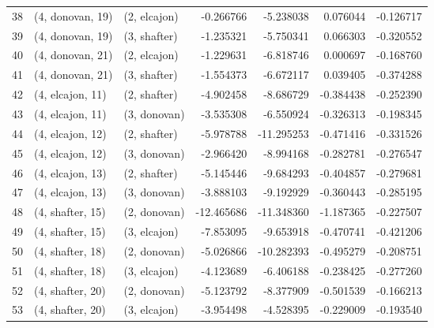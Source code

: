 \begin{tabular}{lllrrrr}
38 &  (4, donovan, 19) &     (2, elcajon) &  -0.266766 &  -5.238038 &   0.076044 & -0.126717 \\
39 &  (4, donovan, 19) &     (3, shafter) &  -1.235321 &  -5.750341 &   0.066303 & -0.320552 \\
40 &  (4, donovan, 21) &     (2, elcajon) &  -1.229631 &  -6.818746 &   0.000697 & -0.168760 \\
41 &  (4, donovan, 21) &     (3, shafter) &  -1.554373 &  -6.672117 &   0.039405 & -0.374288 \\
42 &  (4, elcajon, 11) &     (2, shafter) &  -4.902458 &  -8.686729 &  -0.384438 & -0.252390 \\
43 &  (4, elcajon, 11) &     (3, donovan) &  -3.535308 &  -6.550924 &  -0.326313 & -0.198345 \\
44 &  (4, elcajon, 12) &     (2, shafter) &  -5.978788 & -11.295253 &  -0.471416 & -0.331526 \\
45 &  (4, elcajon, 12) &     (3, donovan) &  -2.966420 &  -8.994168 &  -0.282781 & -0.276547 \\
46 &  (4, elcajon, 13) &     (2, shafter) &  -5.145446 &  -9.684293 &  -0.404857 & -0.279681 \\
47 &  (4, elcajon, 13) &     (3, donovan) &  -3.888103 &  -9.192929 &  -0.360443 & -0.285195 \\
48 &  (4, shafter, 15) &     (2, donovan) & -12.465686 & -11.348360 &  -1.187365 & -0.227507 \\
49 &  (4, shafter, 15) &     (3, elcajon) &  -7.853095 &  -9.653918 &  -0.470741 & -0.421206 \\
50 &  (4, shafter, 18) &     (2, donovan) &  -5.026866 & -10.282393 &  -0.495279 & -0.208751 \\
51 &  (4, shafter, 18) &     (3, elcajon) &  -4.123689 &  -6.406188 &  -0.238425 & -0.277260 \\
52 &  (4, shafter, 20) &     (2, donovan) &  -5.123792 &  -8.377909 &  -0.501539 & -0.166213 \\
53 &  (4, shafter, 20) &     (3, elcajon) &  -3.954498 &  -4.528395 &  -0.229009 & -0.193540 \\
\bottomrule
\end{tabular}
